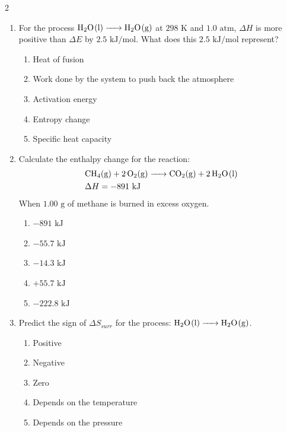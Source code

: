 \documentclass[12pt,letterpaper]{article}
\begin{document}
\begin{multicols*}{2}
\begin{enumerate}
        \item For the process $\ce{H2O(l) -> H2O(g)}$ at $298\text{ K}$ and $1.0\text{ atm}$, $\Delta H$ is more positive than $\Delta E$ by $2.5\text{ kJ/mol}$. What does this $2.5\text{ kJ/mol}$ represent? %
            \begin{enumerate}
                \item Heat of fusion
                \item Work done by the system to push back the atmosphere
                \item Activation energy
                \item Entropy change
                \item Specific heat capacity
            \end{enumerate}
        \columnbreak
        \item Calculate the enthalpy change for the reaction:
            \begin{align*}
                &\ce{CH4(g) + 2O2(g) -> CO2(g) + 2H2O(l)}\\ 
                &\Delta H = -891\text{ kJ}
            \end{align*}
            When $1.00\text{ g}$ of methane is burned in excess oxygen. %
            \begin{enumerate}
                \item $-891\text{ kJ}$
                \item $-55.7\text{ kJ}$
                \item $-14.3\text{ kJ}$
                \item $+55.7\text{ kJ}$
                \item $-222.8\text{ kJ}$
            \end{enumerate}

        \item Predict the sign of $\Delta S_{surr}$ for the process: $\ce{H2O(l) -> H2O(g)}$. %
            \begin{enumerate}
                \item Positive
                \item Negative
                \item Zero
                \item Depends on the temperature
                \item Depends on the pressure
            \end{enumerate}


\end{enumerate}
\end{multicols*}
\end{document}
